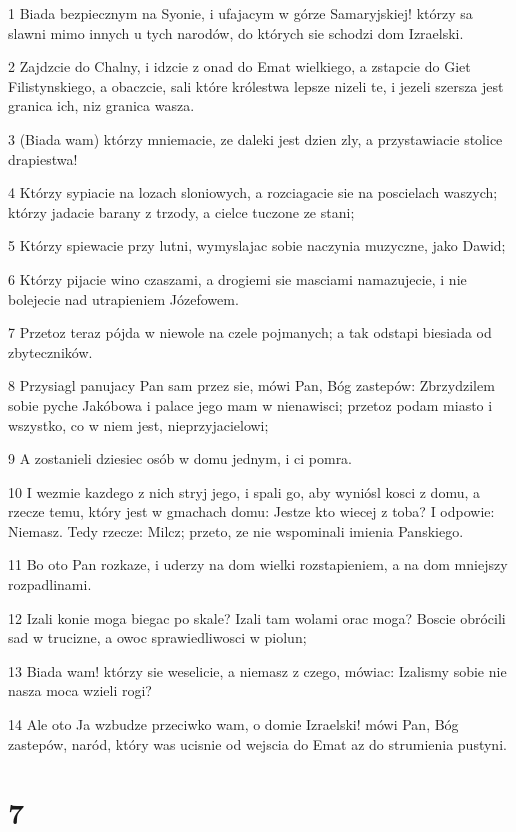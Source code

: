 \par 1 Biada bezpiecznym na Syonie, i ufajacym w górze Samaryjskiej! którzy sa slawni mimo innych u tych narodów, do których sie schodzi dom Izraelski.
\par 2 Zajdzcie do Chalny, i idzcie z onad do Emat wielkiego, a zstapcie do Giet Filistynskiego, a obaczcie, sali które królestwa lepsze nizeli te, i jezeli szersza jest granica ich, niz granica wasza.
\par 3 (Biada wam) którzy mniemacie, ze daleki jest dzien zly, a przystawiacie stolice drapiestwa!
\par 4 Którzy sypiacie na lozach sloniowych, a rozciagacie sie na poscielach waszych; którzy jadacie barany z trzody, a cielce tuczone ze stani;
\par 5 Którzy spiewacie przy lutni, wymyslajac sobie naczynia muzyczne, jako Dawid;
\par 6 Którzy pijacie wino czaszami, a drogiemi sie masciami namazujecie, i nie bolejecie nad utrapieniem Józefowem.
\par 7 Przetoz teraz pójda w niewole na czele pojmanych; a tak odstapi biesiada od zbyteczników.
\par 8 Przysiagl panujacy Pan sam przez sie, mówi Pan, Bóg zastepów: Zbrzydzilem sobie pyche Jakóbowa i palace jego mam w nienawisci; przetoz podam miasto i wszystko, co w niem jest, nieprzyjacielowi;
\par 9 A zostanieli dziesiec osób w domu jednym, i ci pomra.
\par 10 I wezmie kazdego z nich stryj jego, i spali go, aby wyniósl kosci z domu, a rzecze temu, który jest w gmachach domu: Jestze kto wiecej z toba? I odpowie: Niemasz. Tedy rzecze: Milcz; przeto, ze nie wspominali imienia Panskiego.
\par 11 Bo oto Pan rozkaze, i uderzy na dom wielki rozstapieniem, a na dom mniejszy rozpadlinami.
\par 12 Izali konie moga biegac po skale? Izali tam wolami orac moga? Boscie obrócili sad w trucizne, a owoc sprawiedliwosci w piolun;
\par 13 Biada wam! którzy sie weselicie, a niemasz z czego, mówiac: Izalismy sobie nie nasza moca wzieli rogi?
\par 14 Ale oto Ja wzbudze przeciwko wam, o domie Izraelski! mówi Pan, Bóg zastepów, naród, który was ucisnie od wejscia do Emat az do strumienia pustyni.

\chapter{7}

